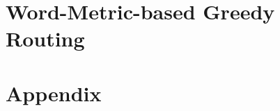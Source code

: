 \documentclass[ oneside,openright,titlepage,numbers=noenddot,headinclude,%
                footinclude=false,cleardoublepage=empty,abstractoff, %
                BCOR=5mm,paper=a4,fontsize=11pt,%
                ngerman,american,%
                ]{scrreprt}
\begin{document}
\part{Word-Metric-based Greedy Routing} %


\cleardoublepage

\cleardoublepage

\cleardoublepage


\appendix
\cleardoublepage
\part*{Appendix}
%

\cleardoublepage
\end{document}
